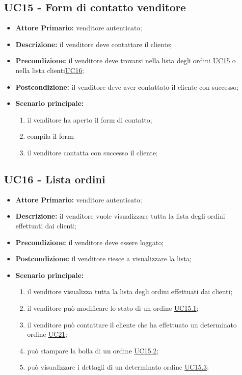\subsection{UC15 - Form di contatto venditore}
\label{UC15}
\begin{itemize}
    \item \textbf{Attore Primario:} venditore autenticato;
    \item \textbf{Descrizione:} il venditore deve contattare il cliente;
    \item \textbf{Precondizione:} il venditore deve trovarsi nella lista degli ordini \hyperref[UC15]{UC15} o nella lista clienti\hyperref[UC16]{UC16};
    \item \textbf{Postcondizione:} il venditore deve aver contattato il cliente con successo;
    \item \textbf{Scenario principale:}
    \begin{enumerate}
        \item il venditore ha aperto il form di contatto;
        \item compila il form;
        \item il venditore contatta con successo il cliente;
    \end{enumerate}
\end{itemize}

\subsection{UC16 - Lista ordini}
\label{UC16}
\begin{itemize}
    \item \textbf{Attore Primario:} venditore autenticato;
    \item \textbf{Descrizione:} il venditore vuole visualizzare tutta la lista degli ordini effettuati dai clienti;
    \item \textbf{Precondizione:} il venditore deve essere loggato;
    \item \textbf{Postcondizione:} il venditore riesce a visualizzare la lista;
    \item \textbf{Scenario principale:}
    \begin{enumerate}
        \item il venditore visualizza tutta la lista degli ordini effettuati dai clienti;
         \item il venditore può modificare lo stato di un ordine \hyperref[UC15.1]{UC15.1};
        \item il venditore può contattare il cliente che ha effettuato un determinato ordine \hyperref[UC21]{UC21};
        \item può stampare la bolla di un ordine \hyperref[UC15.2]{UC15.2};
        \item può visualizzare i dettagli di un determinato ordine \hyperref[UC15.3]{UC15.3}; 
    \end{enumerate}
\end{itemize}

